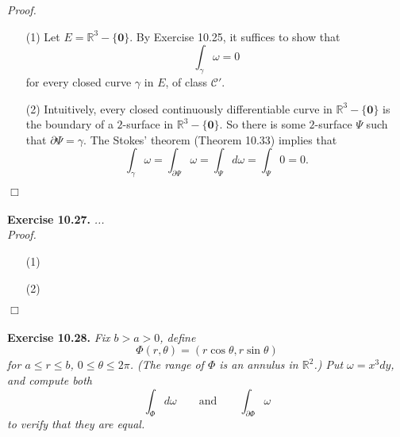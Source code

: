 \documentclass{article}
\begin{document}
\emph{Proof.}
\begin{enumerate}
\item[(1)]
  Let $E = \mathbb{R}^3 - \{\mathbf{0}\}$.
  By Exercise 10.25,
  it suffices to show that
  \[
    \int_{\gamma} \omega = 0
  \]
  for every closed curve $\gamma$ in $E$, of class $\mathscr{C}'$.

\item[(2)]
  Intuitively, every closed continuously differentiable curve in $\mathbb{R}^3 - \{\mathbf{0}\}$
  is the boundary of a $2$-surface in $\mathbb{R}^3 - \{\mathbf{0}\}$.
  So there is some $2$-surface $\Psi$ such that $\partial \Psi = \gamma$.
  The Stokes' theorem (Theorem 10.33) implies that
  \[
    \int_{\gamma} \omega
    = \int_{\partial \Psi} \omega
    = \int_{\Psi} d\omega
    = \int_{\Psi} 0
    = 0.
  \]
\end{enumerate}
$\Box$ \\\\









\textbf{Exercise 10.27.}
\emph{...} \\

\emph{Proof.}
\begin{enumerate}
\item[(1)]
\item[(2)]

\end{enumerate}
$\Box$ \\\\






\textbf{Exercise 10.28.}
\emph{Fix $b > a > 0$, define
\[
  \Phi(r,\theta) = (r\cos\theta, r\sin\theta)
\]
for $a \leq r \leq b$, $0 \leq \theta \leq 2\pi$.
(The range of $\Phi$ is an annulus in $\mathbb{R}^2$.)
Put $\omega = x^3 dy$,
and compute both
\[
  \int_{\Phi} d\omega
  \qquad
  \text{and}
  \qquad
  \int_{\partial\Phi} \omega
\]
to verify that they are equal.} \\
\end{document}
